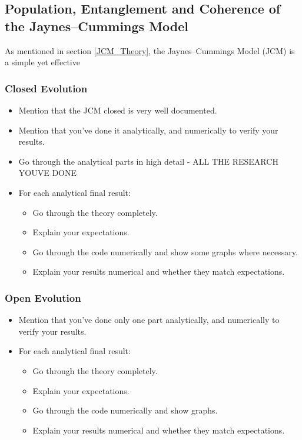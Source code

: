 \documentclass[12pt]{article}
\begin{document}
\subsection{Population, Entanglement and Coherence of the Jaynes--Cummings Model} \label{res_JCM}

As mentioned in section \ref{JCM_Theory}, the Jaynes--Cummings Model (JCM) is a simple yet effective 





















\subsubsection{Closed Evolution}
\begin{itemize}
    \item Mention that the JCM closed is very well documented. 
    \item Mention that you've done it analytically, and numerically to verify your results.
    \item Go through the analytical parts in high detail - ALL THE RESEARCH YOUVE DONE 
    \item For each analytical final result:
    \begin{itemize}
        \item Go through the theory completely. 
        \item Explain your expectations.
        \item Go through the code numerically and show some graphs where necessary. 
        \item Explain your results numerical and whether they match expectations. 
    \end{itemize}
\end{itemize}
\subsubsection{Open Evolution}
\begin{itemize}
    \item Mention that you've done only one part analytically, and numerically to verify your results.
    \item For each analytical final result:
    \begin{itemize}
        \item Go through the theory completely. 
        \item Explain your expectations.
        \item Go through the code numerically and show graphs. 
        \item Explain your results numerical and whether they match expectations. 
    \end{itemize}
\end{itemize}
\end{document}
